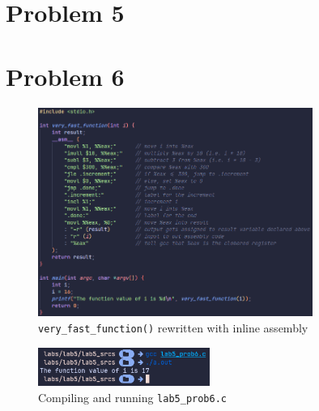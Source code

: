 \documentclass{article}
\begin{document}
\section*{Problem 5}


\section*{Problem 6}

\begin{figure}[H]
    \centering
    \includegraphics[width=0.8\textwidth]{../images/prob6_code.png}
    \caption{\texttt{very\_fast\_function()} rewritten with inline assembly}
\end{figure}

\begin{figure}[H]
    \centering
    \includegraphics[width=0.5\textwidth]{../images/prob6_out.png}
    \caption{Compiling and running \texttt{lab5\_prob6.c}}
\end{figure}
\end{document}
